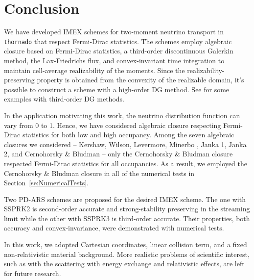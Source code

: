 \section{Conclusion}\label{se:Conclusion}

We have developed IMEX schemes for two-moment neutrino transport in \texttt{thornado} that respect Fermi-Dirac statistics.
The schemes employ algebraic closure based on Fermi-Dirac statistics, a third-order discontinuous Galerkin method, the Lax-Friedrichs flux, and convex-invariant time integration to maintain cell-average realizability of the moments.
Since the realizability-preserving property is obtained from the convexity of the realizable domain, it's possible to construct a scheme with a high-order DG method.
See \cite{chu_etal_2018} for some examples with third-order DG methods.

In the application motivating this work, the neutrino distribution function can vary from 0 to 1.
Hence, we have considered algebraic closure respecting Fermi-Dirac statistics for both low and high occupancy.
Among the seven algebraic closures we considered -- Kershaw\cite{kershaw_1976}, Wilson\cite{wilson_1975,leblancWilson_1970}, Levermore\cite{levermore_1984}, Minerbo \cite{minerbo_1978}, Janka 1\cite{janka_1991}, Janka 2\cite{janka_1992}, and Cernohorsky \& Bludman\cite{cernohorskyBludman_1994} -- only the Cernohorsky \& Bludman closure respected Fermi-Dirac statistics for all occupancies.
As a result, we employed the Cernohorsky \& Bludman closure in all of the numerical tests in Section~\ref{se:NumericalTests}.

Two PD-ARS schemes are proposed for the desired IMEX scheme.
The one with SSPRK2 is second-order accurate and strong-stability preserving in the streaming limit while the other with SSPRK3 is third-order accurate.
Their properties, both accuracy and convex-invariance, were demonstrated with numerical tests.

In this work, we adopted Cartesian coordinates, linear collision term, and a fixed non-relativistic material background.
More realistic problems of scientific interest, such as with the scattering with energy exchange and relativistic effects, are left for future research.